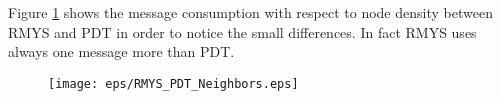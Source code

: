 Figure \ref{fig:RMYS_PDT_Neighbors} shows the message consumption with respect to node density between RMYS and PDT in order to notice the small differences.
In fact RMYS uses always one message more than PDT.

\begin{figure}[h!]
\centering
\texttt{[image: eps/RMYS\_PDT\_Neighbors.eps]}
\caption{}
\label{fig:RMYS_PDT_Neighbors}
\end{figure}

%
%
%
%
%
%
%
%
%
